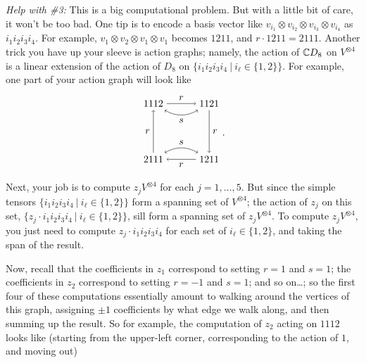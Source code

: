 \documentclass[11pt, reqno]{amsart}
\theoremstyle{plain}
\theoremstyle{definition}
\theoremstyle{example}
\newcommand\TikZ[1]{\begin{matrix}\begin{tikzpicture}#1\end{tikzpicture}\end{matrix}}
\begin{document}
\emph{Help with \#3:} This is a big computational problem. But with a little bit of care, it won't be too bad. One tip is to encode a basis vector like $v_{i_1} \otimes v_{i_2} \otimes v_{i_3} \otimes v_{i_4}$ as $i_1i_2i_3i_4$. For example, $v_1 \otimes v_2 \otimes v_1\otimes v_1$ becomes $1211$, and $r \cdot 1211 = 2111$. Another trick you have up your sleeve is action graphs; namely, the action of $\mathbb{C} D_8$ on $V^{\otimes 4}$ is a linear extension of the action of $D_8$ on $\{i_1i_2i_3i_4 ~|~ i_\ell \in \{1,2\}\}$. For example, one part of your action graph will look like 
$$\TikZ{
	\node (1112) at (0,2) {1112}; 
	\node (1121) at (2,2) {1121}; 
	\node (1211) at (2,0) {1211}; 
	\node (2111) at (0,0) {2111}; 
	\draw[->] (1112) to node[above]{$r$} (1121);
	\draw[->] (1121) to node[right]{$r$} (1211);
	\draw[->] (1211) to node[below]{$r$} (2111);
	\draw[->] (2111) to node[left]{$r$} (1112);
	\draw[<->, bend right] (1112) to node[below]{$s$} (1121);
	\draw[<->, bend left] (2111) to node[above]{$s$} (1211);
}.$$
Next, your job is to compute $z_j V^{\otimes 4}$ for each $j = 1, \dots, 5$. But since the simple tensors $\{i_1i_2i_3i_4 ~|~ i_\ell \in \{1,2\}\}$ form a spanning set of $V^{\otimes 4}$; the action of $z_j$ on this set, $\{z_j \cdot i_1i_2i_3i_4 ~|~ i_\ell \in \{1,2\}\}$, sill form a spanning set of  $z_j V^{\otimes 4}$. To compute $z_j V^{\otimes 4}$, you just need to compute $z_j \cdot i_1i_2i_3i_4$ for each set of $i_\ell \in \{1,2\}$, and taking the span of the result. 


Now, recall that the coefficients in $z_1$ correspond to setting $r=1$ and $s=1$; the coefficients in $z_2$ correspond to setting $r=-1$ and $s=1$;  and so on\dots; so the first four of these computations essentially amount to walking around the vertices of this graph, assigning $\pm 1$ coefficients by what edge we walk along, and then summing up the result. So for example, the computation of $z_2$ acting on $1112$ looks like (starting from the upper-left corner, corresponding to the action of $1$, and moving out)
\end{document}
